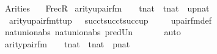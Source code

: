 %
\begin{isabellebody}%
%
%
\isadelimdocument
%
\endisadelimdocument
%
\isatagdocument
%
\isamarkuptrue%
%
\endisatagdocument
{\isafolddocument}%
%
\isadelimdocument
%
\endisadelimdocument
%
\isadelimtheory
%
\endisadelimtheory
%
\isatagtheory
{}\isamarkupfalse%
\ Arities\isanewline
\ \ \ FrecR\isanewline
{}%
\endisatagtheory
{\isafoldtheory}%
%
\isadelimtheory
\isanewline
%
\endisadelimtheory
\isanewline
{}\isamarkupfalse%
\ arity{\isacharunderscore}{\kern0pt}upair{\isacharunderscore}{\kern0pt}fm\ {\isacharcolon}{\kern0pt}\ {\isachardoublequoteopen}{\isasymlbrakk}\ \ t{}{\isasymin}nat\ {\isacharsemicolon}{\kern0pt}\ t{}{\isasymin}nat\ {\isacharsemicolon}{\kern0pt}\ up{\isasymin}nat\ \ {\isasymrbrakk}\ {\isasymLongrightarrow}\ \isanewline
\ \ arity{\isacharparenleft}{\kern0pt}upair{\isacharunderscore}{\kern0pt}fm{\isacharparenleft}{\kern0pt}t{}{\isacharcomma}{\kern0pt}t{}{\isacharcomma}{\kern0pt}up{\isacharparenright}{\kern0pt}{\isacharparenright}{\kern0pt}\ {\isacharequal}{\kern0pt}\ {\isasymUnion}\ {\isacharbraceleft}{\kern0pt}succ{\isacharparenleft}{\kern0pt}t{}{\isacharparenright}{\kern0pt}{\isacharcomma}{\kern0pt}succ{\isacharparenleft}{\kern0pt}t{}{\isacharparenright}{\kern0pt}{\isacharcomma}{\kern0pt}succ{\isacharparenleft}{\kern0pt}up{\isacharparenright}{\kern0pt}{\isacharbraceright}{\kern0pt}{\isachardoublequoteclose}\isanewline
%
\isadelimproof
\ \ %
\endisadelimproof
%
\isatagproof
{}\isamarkupfalse%
\ \ upair{\isacharunderscore}{\kern0pt}fm{\isacharunderscore}{\kern0pt}def\isanewline
\ \ \isamarkupfalse%
\ nat{\isacharunderscore}{\kern0pt}union{\isacharunderscore}{\kern0pt}abs{}\ nat{\isacharunderscore}{\kern0pt}union{\isacharunderscore}{\kern0pt}abs{}\ pred{\isacharunderscore}{\kern0pt}Un\ \ \ \isanewline
\ \ \isamarkupfalse%
\ auto%
\endisatagproof
{\isafoldproof}%
%
\isadelimproof
\isanewline
%
\endisadelimproof
\isanewline
\isanewline
{}\isamarkupfalse%
\ arity{\isacharunderscore}{\kern0pt}pair{\isacharunderscore}{\kern0pt}fm\ {\isacharcolon}{\kern0pt}\ {\isachardoublequoteopen}{\isasymlbrakk}\ \ t{}{\isasymin}nat\ {\isacharsemicolon}{\kern0pt}\ t{}{\isasymin}nat\ {\isacharsemicolon}{\kern0pt}\ p{\isasymin}nat\ \ {\isasymrbrakk}\ {\isasymLongrightarrow}\ \isanewline

\end{isabellebody}
